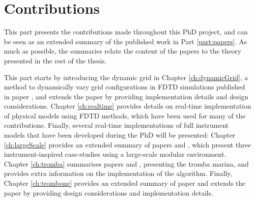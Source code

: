 \chapter*{Contributions}
This part presents the contributions made throughout this PhD project, and can be seen as an extended summary of the published work in Part \ref{part:papers}. As much as possible, the summaries relate the content of the papers to the theory presented in the rest of the thesis. 

This part starts by introducing the dynamic grid in Chapter \ref{ch:dynamicGrid}, a method to dynamically vary grid configurations in FDTD simulations published in paper \citeP[G], and extends the paper by providing implementation details and design considerations. Chapter \ref{ch:realtime} provides details on real-time implementation of physical models using FDTD methods, which have been used for many of the contributions. 
Finally, several real-time implementations of full instrument models that have been developed during the PhD will be presented: Chapter \ref{ch:largeScale} provides an extended summary of papers \citeP[A] and \citeP[B], which present three instrument-inspired case-studies using a large-scale modular environment. Chapter \ref{ch:tromba} summarises papers \citeP[D] and \citeP[E], presenting the tromba marina, and provides extra information on the implementation of the algorithm. Finally, Chapter \ref{ch:trombone} provides an extended summary of paper \citeP[H] and extends the paper by providing design considerations and implementation details.